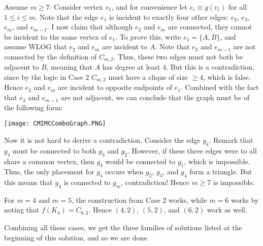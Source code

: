 \documentclass[10pt]{article}
\begin{document}
\begin{enumerate}
\begin{itemize}
\par Assume $m\geq 7$.  Consider vertex $v_1$, and for convenience let $e_i\equiv g(v_i)$ for all $1\leq i\leq m$.  Note that the edge $e_1$ is incident to exactly four other edges: $e_2$, $e_3$, $e_m$, and $e_{m-1}$.  I now claim that although $e_2$ and $e_m$ are connected, they cannot be incident to the same vertex of $e_1$.  To prove this, write $e_1=\{A,B\}$, and assume WLOG that $e_2$ and $e_m$ are incident to $A$.  Note that $e_3$ and $e_{m-1}$ are not connected by the definition of $C_{m,2}$.  Thus, these two edges must not both be adjacent to $B$, meaning that $A$ has degree at least $4$.  But this is a contradiction, since by the logic in Case 2 $C_{m,2}$ must have a clique of size $\geq 4$, which is false.  Hence $e_2$ and $e_m$ are incident to opposite endpoints of $e_1$.  Combined with the fact that $e_3$ and $e_{m-1}$ are not adjacent, we can conclude that the graph must be of the following form:

\begin{center}\texttt{[image: CMIMCComboGraph.PNG]}\end{center}

Now it is not hard to derive a contradiction.  Consider the edge $g_4$.  Remark that $g_4$ must be connected to both $g_3$ and $g_2$.  However, if these three edges were to all share a common vertex, then $g_4$ would be connected to $g_1$, which is impossible.  Thus, the only placement for $g_4$ occurs when $g_2$, $g_3$, and $g_4$ form a triangle.  But this means that $g_4$ is connected to $g_m$, contradiction!  Hence $m\geq 7$ is impossible.

\par For $m=4$ and $m=5$, the construction from Case 2 works, while $m=6$ works by noting that $f(K_4)=C_{6,2}$.  Hence $(4,2)$, $(5,2)$, and $(6,2)$ work as well.

\end{itemize}

Combining all these cases, we get the three families of solutions listed at the beginning of this solution, and so we are done.

\end{enumerate}
\end{document}
